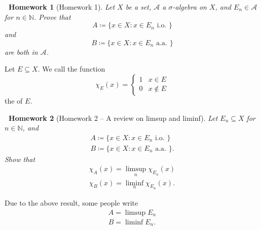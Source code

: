 \documentclass[notoc,notitlepage]{tufte-book}
\newtheorem*{homework}{\faCogs\ Homework}
\begin{document}
\begin{homework}[Homework 1]\label{homework:1}
  Let $X$ be a set, $\mathcal{A}$ a $\sigma$-algebra on $X$,
  and $E_n \in \mathcal{A}$ for $n \in \mathbb{N}$.
  Prove that
  \begin{equation*}
    A \coloneqq \{ x \in X : x \in E_n \text{ i.o. } \}
  \end{equation*}
  and
  \begin{equation*}
    B \coloneqq \{ x \in X : x \in E_n \text{ a.a. } \}
  \end{equation*}
  are both in $\mathcal{A}$.
\end{homework}

\begin{defn}\label{defn:characteristic_function}
  Let $E \subseteq X$. We call the function 
  \begin{equation*}
    \chi_E(x) = \begin{cases}
      1 & x \in E \\
      0 & x \notin E
    \end{cases}
  \end{equation*}
  the  of $E$.
\end{defn}

\begin{homework}[Homework 2 -- A review on limsup and liminf]\label{homework:2}
  Let $E_n \subseteq X$ for $n \in \mathbb{N}$, and
  \begin{gather*}
    A \coloneqq \{ x \in X : x \in E_n \text{ i.o. } \} \\
    B \coloneqq \{ x \in X : x \in E_n \text{ a.a. } \}.
  \end{gather*}
  Show that
  \begin{gather*}
    \chi_A(x) = \limsup_{n} \chi_{E_n}(x) \\
    \chi_B(x) = \liminf_{n} \chi_{E_n}(x).
  \end{gather*}
\end{homework}

\begin{remark}
  Due to the above result, some people write
  \begin{gather*}
    A = \limsup E_n \\
    B = \liminf E_n.
  \end{gather*}
\end{remark}

\end{document}
